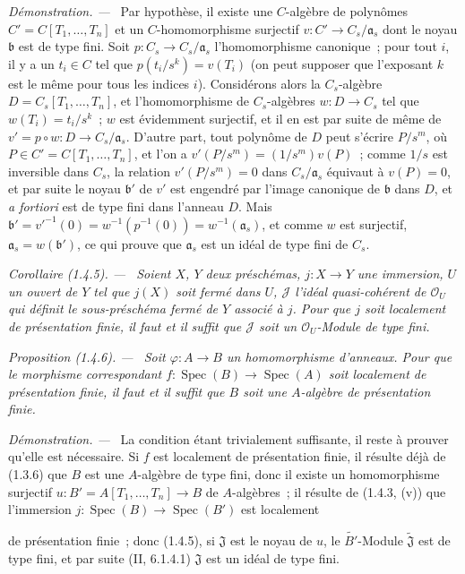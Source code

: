 \documentclass[10pt,oneside]{book}
\makeatletter
\newcommand{\setmanualcurrentlabel}[1]{\def\@currentlabel{#1}}
\newcommand{\oldpage}[2][]{%
  \setcounter{footnote}{0}%
  \marginpar{\scriptsize\textbf{#1}~|~#2}\ignorespaces}
\newenvironment{proposition}[1][]{%
  \setmanualcurrentlabel{#1}\par\medskip\noindent\itshape Proposition (#1). ---\ }{\par}
\newenvironment{corollary}[1][]{%
  \setmanualcurrentlabel{#1}\par\medskip\noindent\itshape Corollaire (#1). ---\ }{\par}
\newenvironment{proof}{%
  \par\medskip\noindent\textit{Démonstration. ---\ }}{\par}
\makeatother
\begin{document}
\begin{proof}
Par hypothèse, il existe une $C$-algèbre de polynômes
$C'=C[T_1,\ldots,T_n]$ et un $C$-homomorphisme surjectif
$v:C'\to C_s/\mathfrak a_s$ dont le noyau $\mathfrak b$ est de type fini.
Soit $p:C_s\to C_s/\mathfrak a_s$ l'homomorphisme canonique~; pour tout $i$,
il y a un $t_i\in C$ tel que $p(t_i/s^k)=v(T_i)$ (on peut supposer que
l'exposant $k$ est le même pour tous les indices $i$). Considérons alors la
$C_s$-algèbre $D=C_s[T_1,\ldots,T_n]$, et l'homomorphisme de $C_s$-algèbres
$w:D\to C_s$ tel que $w(T_i)=t_i/s^k$~; $w$ est évidemment surjectif, et il
en est par suite de même de $v'=p\circ w:D\to C_s/\mathfrak a_s$. D'autre
part, tout polynôme de $D$ peut s'écrire $P/s^m$, où
$P\in C'=C[T_1,\ldots,T_n]$, et l'on a
$v'(P/s^m)=(1/s^m)v(P)$~; comme $1/s$ est inversible dans $C_s$, la relation
$v'(P/s^m)=0$ dans $C_s/\mathfrak a_s$ équivaut à $v(P)=0$, et par suite le
noyau $\mathfrak b'$ de $v'$ est engendré par l'image canonique de
$\mathfrak b$ dans $D$, et \emph{a fortiori} est de type fini dans l'anneau
$D$. Mais
$\mathfrak b'=v'^{-1}(0)=w^{-1}(p^{-1}(0))=w^{-1}(\mathfrak a_s)$, et comme
$w$ est surjectif, $\mathfrak a_s=w(\mathfrak b')$, ce qui prouve que
$\mathfrak a_s$ est un idéal de type fini de $C_s$.
\end{proof}

\begin{corollary}[1.4.5]
\label{IV.1.4.5-fr}
Soient $X$, $Y$ deux préschémas, $j:X\to Y$ une immersion, $U$ un ouvert de
$Y$ tel que $j(X)$ soit fermé dans $U$, $\mathcal J$ l'idéal quasi-cohérent de
$\mathcal O_U$ qui définit le sous-préschéma fermé de $Y$ associé à $j$. Pour
que $j$ soit localement de présentation finie, il faut et il suffit que
$\mathcal J$ soit un $\mathcal O_U$-Module de type fini.
\end{corollary}

\par\medskip\noindent
\begin{proposition}[1.4.6]
\label{IV.1.4.6-fr}
Soit $\varphi:A\to B$ un homomorphisme d'anneaux. Pour que le morphisme
correspondant $f:\operatorname{Spec}(B)\to\operatorname{Spec}(A)$ soit localement de présentation finie,
il faut et il suffit que $B$ soit une $A$-algèbre de présentation finie.
\end{proposition}

\begin{proof}
La condition étant trivialement suffisante, il reste à prouver qu'elle est
nécessaire. Si $f$ est localement de présentation finie, il résulte déjà de
(1.3.6) que $B$ est une $A$-algèbre de type fini, donc il existe un
homomorphisme surjectif $u:B'=A[T_1,\ldots,T_n]\to B$ de $A$-algèbres~; il
résulte de (1.4.3, (v)) que l'immersion
$j:\operatorname{Spec}(B)\to\operatorname{Spec}(B')$ est localement

\oldpage[IV-1]{233}

de présentation finie~; donc (1.4.5), si $\mathfrak J$ est le noyau de $u$,
le $\widetilde{B'}$-Module $\widetilde{\mathfrak J}$ est de type fini, et par
suite (II, 6.1.4.1) $\mathfrak J$ est un idéal de type fini.
\end{proof}
\end{document}
